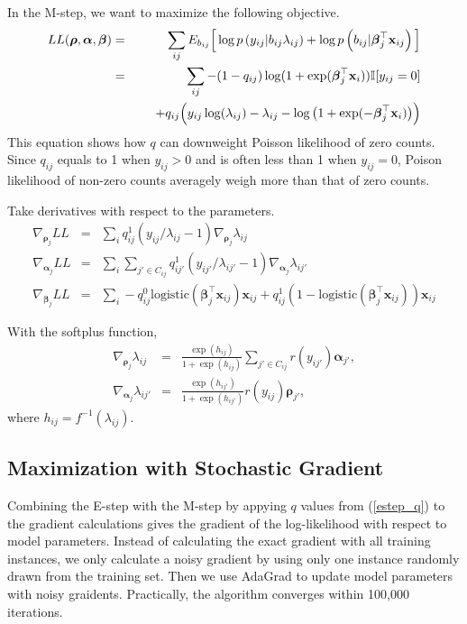 \documentclass{article}
\newcommand{\wt}{\boldsymbol{\rho}}
\newcommand{\obswt}{\boldsymbol{\beta}}
\newcommand{\emb}{\boldsymbol{\alpha}}
\begin{document}
In the M-step, we want to maximize the following objective.
\begin{eqnarray}
LL(\wt, \emb, \obswt) &=& \sum_{ij} E_{b_{ij}} \Big[\log p\left(y_{ij} | b_{ij} \lambda_{ij} \right) + \log p\left(b_{ij} | \obswt_j^\top \mathbf{x}_{ij}\right)\Big] \nonumber\\
&=& \sum_{ij}  - (1 - q_{ij}) \log (1 +  \exp(\obswt_j^\top \mathbf{x}_i)) \mathbb{I}[y_{ij}=0] \nonumber \\
&& \hspace{0.5cm} + q_{ij} \Big( y_{ij}\log(\lambda_{ij}) - \lambda_{ij} - \log \big(1 + \exp( - \obswt_j^\top \mathbf{x}_i) \big) \Big) 
\end{eqnarray}
This equation shows how $q$ can downweight Poisson likelihood of zero counts. Since $q_{ij}$ equals to 1 when $y_{ij} > 0$
and is often less than 1 when $y_{ij} = 0$, Poison likelihood of non-zero counts averagely weigh more than that of zero counts. 

Take derivatives with respect to the parameters. 
\begin{eqnarray}
\nabla_{\wt_j} LL &=& \sum_{i}  q_{ij}^1 \left( y_{ij}/\lambda_{ij} - 1 \right)
\nabla_{\wt_j} \lambda_{ij} \label{grad_rho}\\
\nabla_{\emb_j} LL &=& \sum_{i}\sum_{j' \in C_{ij}}  q_{ij'}^1 \left( y_{ij'}/\lambda_{ij'} - 1 \right)
\nabla_{\emb_j} \lambda_{ij'} \label{grad_alpha}\\
\nabla_{\obswt_j} LL  &=& \sum_{i} - q_{ij}^0 \mathrm{logistic}(\obswt_j^\top \mathbf{x}_{ij}) \mathbf{x}_{ij} + q_{ij}^1 (1 - \mathrm{logistic}(\obswt_j^\top \mathbf{x}_{ij})) \mathbf{x}_{ij} \label{grad_beta}
\end{eqnarray}

With the softplus function, 
\begin{eqnarray}
\nabla_{\wt_j} \lambda_{ij} &=& \frac{\exp(h_{ij})}{1 + \exp(h_{ij})} \sum_{j' \in C_{ij}} r(y_{ij'}) \emb_{j'}, \\
\nabla_{\emb_{j}} \lambda_{ij'} &=& \frac{\exp(h_{ij'})}{1 + \exp(h_{ij'})}  r(y_{ij}) \wt_{j'},
\end{eqnarray}
where $h_{ij} = f^{-1}(\lambda_{ij})$.



\subsection{Maximization with Stochastic Gradient}

Combining the E-step with the M-step by appying $q$ values from (\ref{estep_q}) to the gradient calculations gives the gradient of 
the log-likelihood with respect to model parameters. Instead of calculating the exact gradient with all training instances, we 
only calculate a noisy gradient by using only one instance randomly drawn from the training set. Then we use AdaGrad to 
update model parameters with noisy graidents. Practically, the algorithm converges within 100,000 iterations. 
\end{document}
